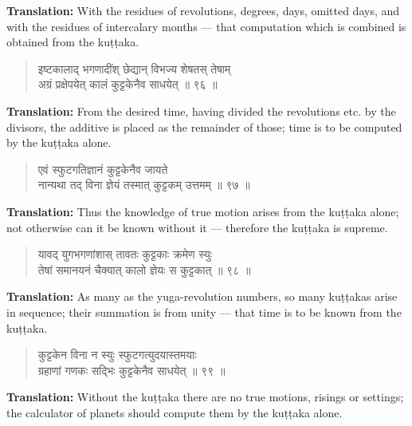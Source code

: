 \documentclass[11pt,a4paper]{article}
\newenvironment{shloka}{\begin{verse}\devanagarifont\large}{\end{verse}}
\begin{document}
\textbf{Translation:}\quad
With the residues of revolutions, degrees, days, omitted days, and
with the residues of intercalary months — that computation which is
combined is obtained from the kuṭṭaka.

\vspace{0.3cm}

\begin{shloka}
इष्टकालाद् भगणादींश् छेद्यान् विभज्य शेषतस् तेषाम् \\
अग्रं प्रक्षेपयेत् कालं कुट्टकेनैव साधयेत् ॥ ९६ ॥
\end{shloka}

\textbf{Translation:}\quad
From the desired time, having divided the revolutions etc. by the
divisors, the additive is placed as the remainder of those; time is
to be computed by the kuṭṭaka alone.

\vspace{0.3cm}

\begin{shloka}
एवं स्फुटगतिज्ञानं कुट्टकेनैव जायते \\
नान्यथा तद् विना ज्ञेयं तस्मात् कुट्टकम् उत्तमम् ॥ ९७ ॥
\end{shloka}

\textbf{Translation:}\quad
Thus the knowledge of true motion arises from the kuṭṭaka alone;
not otherwise can it be known without it — therefore the kuṭṭaka is
supreme.

\vspace{0.3cm}

\begin{shloka}
यावद् युगभगणांशास् तावतः कुट्टकाः क्रमेण स्युः \\
तेषां समानयनं चैक्यात् कालो ज्ञेयः स कुट्टकात् ॥ ९८ ॥
\end{shloka}

\textbf{Translation:}\quad
As many as the yuga-revolution numbers, so many kuṭṭakas arise in
sequence; their summation is from unity — that time is to be known
from the kuṭṭaka.

\vspace{0.3cm}

\begin{shloka}
कुट्टकेन विना न स्युः स्फुटगत्युदयास्तमयाः \\
ग्रहाणां गणकः सद्भिः कुट्टकेनैव साधयेत् ॥ ९९ ॥
\end{shloka}

\textbf{Translation:}\quad
Without the kuṭṭaka there are no true motions, risings or settings;
the calculator of planets should compute them by the kuṭṭaka alone.
\end{document}
